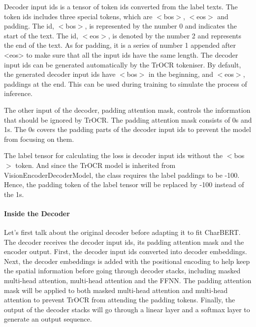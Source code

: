 Decoder input ids is a tensor of token ids converted from the label texts. The token ids includes three special tokens, which are $<$bos$>$, $<$eos$>$ and padding. The id, $<$bos$>$, is represented by the number 0 and indicates the start of the text. The id, $<$eos$>$, is denoted by the number 2 and represents the end of the text. As for padding, it is a series of number 1 appended after <eos> to make sure that all the input ids have the same length. The decoder input ids can be generated automatically by the TrOCR tokeniser. By default, the generated decoder input ids have $<$bos$>$ in the beginning, and $<$eos$>$, paddings at the end. This can be used during training to simulate the process of inference. 

The other input of the decoder, padding attention mask, controls the information that should be ignored by TrOCR. The padding attention mask consists of 0s and 1s. The 0s covers the padding parts of the decoder input ids to prevent the model from focusing on them.

The label tensor for calculating the loss is decoder input ids without the $<$bos$>$ token. And since the TrOCR model is inherited from VisionEncoderDecoderModel, the class requires the label paddings to be -100. Hence, the padding token of the label tensor will be replaced by -100 instead of the 1s.

\paragraph*{Inside the Decoder}
\label{par:3_inside_the_decoder}
Let's first talk about the original decoder before adapting it to fit CharBERT. The decoder receives the decoder input ids, its padding attention mask and the encoder output. First, the decoder input ids converted into decoder embeddings. Next, the decoder embeddings is added with the positional encoding to help keep the spatial information before going through decoder stacks, including masked multi-head attention, multi-head attention and the FFNN. The padding attention mask will be applied to both masked multi-head attention and multi-head attention to prevent TrOCR from attending the padding tokens. Finally, the output of the decoder stacks will go through a linear layer and a softmax layer to generate an output sequence. 


